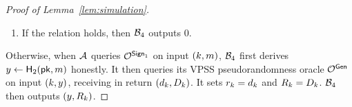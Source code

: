 \begin{proof}[Proof of Lemma~\ref{lem:simulation}]
\begin{enumerate}
      where $\cramerpoly_{a_\ell}(x)$ and $\cramerpoly_{a_i}(x)$ are defined in Equation~\ref{eq:cramerpoly}.

    \item If the relation holds,
      then $\mathcal{B}_4$ outputs $0$.

%

  \end{enumerate}


  Otherwise, when $\mathcal{A}$ queries $\mathcal{O}^{\mathsf{Sign}_1}$ on input $(k, m)$,
  $\mathcal{B}_4$ first derives $y \gets \mathsf{H}_2(\mathsf{pk}, m)$ honestly.
  It then queries its VPSS pseudorandomness oracle $\mathcal{O}^{\mathsf{Gen}}$ on input $(k, y)$,
  receiving in return $(d_k, D_k)$.
  It sets $r_k = d_k $ and
  $R_k = D_k$.
  $\mathcal{B}_4$ then outputs $(y, R_k)$.


\end{proof}
